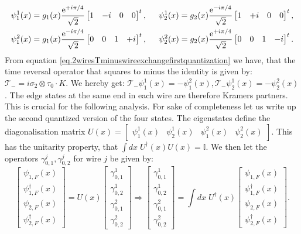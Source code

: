 \begin{align}
\psi^1_1(x) &= g_1(x)\frac{\text{e}^{+i\pi/4}}{\sqrt{2}}\begin{bmatrix} 1 & -i & 0 & 0 \end{bmatrix}^t , \hspace{0.5cm} \psi^1_2(x) = g_2(x)\frac{\text{e}^{-i\pi/4}}{\sqrt{2}}\begin{bmatrix} 1 & +i & 0 & 0 \end{bmatrix}^t, \nonumber \\
\psi^2_1(x) &= g_1(x)\frac{\text{e}^{-i\pi/4}}{\sqrt{2}}\begin{bmatrix} 0 & 0 & 1 & +i \end{bmatrix}^t , \hspace{0.5cm} \psi^2_2(x) = g_2(x)\frac{\text{e}^{+i\pi/4}}{\sqrt{2}}\begin{bmatrix} 0 & 0 & 1 & -i \end{bmatrix}^t.
\end{align}
From equation \eqref{eq.2wiresTminuswireexchangefirstquantization} we have, that the time reversal operator that squares to minus the identity is given by: $\mathcal{T}_- = i\sigma_2\otimes\tau_0 \cdot K$. We hereby get: $\mathcal{T}_-\psi^1_1(x) = -\psi^2_1(x), \mathcal{T}_-\psi^1_2(x) = -\psi^2_2(x)$. The edge states at the same end in each wire are therefore Kramers partners. This is crucial for the following analysis. For sake of completeness let us write up the second quantized version of the four states. The eigenstates define the diagonalisation matrix $U(x) = \begin{bmatrix} \psi^{1}_{1}(x) & \psi^{1}_{2}(x) & \psi^{2}_{1}(x) & \psi^{2}_{2}(x) \end{bmatrix}$. This has the unitarity property, that $\int dx \; U^\dagger(x) U(x) = \mathbb{I}$. We then let the operators $\gamma^{j}_{0,1}, \gamma^{j}_{0,2}$ for wire $j$ be given by:
\begin{equation}
\begin{bmatrix} \psi_{1,F}(x) \\ \psi_{1,F}^\dagger(x) \\ \psi_{2,F}(x) \\ \psi_{2,F}^\dagger(x) \end{bmatrix} = U(x) \begin{bmatrix} \gamma^{1}_{0,1} \\ \gamma^{1}_{0,2} \\ \gamma^{2}_{0,1} \\ \gamma^{2}_{0,2} \end{bmatrix} \Rightarrow \begin{bmatrix} \gamma^{1}_{0,1} \\ \gamma^{1}_{0,2} \\ \gamma^{2}_{0,1} \\ \gamma^{2}_{0,2} \end{bmatrix} = \int dx \; U^\dagger(x) \begin{bmatrix} \psi_{1,F}(x) \\ \psi_{1,F}^\dagger(x) \\ \psi_{2,F}(x) \\ \psi_{2,F}^\dagger(x) \end{bmatrix}.
\label{eq.Majoranaedgemodedef} 
\end{equation} 
